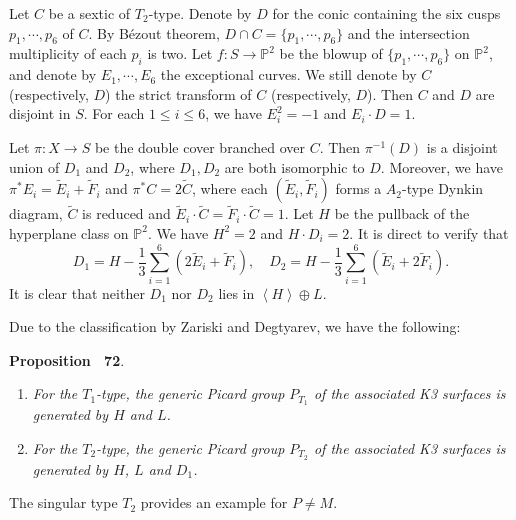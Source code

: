\documentclass[
]{article}
\begin{document}
Let \(C\) be a sextic of \(T_2\)-type. Denote by \(D\) for the conic
containing the six cusps \(p_1,\cdots,p_6\) of \(C\). By Bézout theorem,
\(D\cap C = \{ p_1,\cdots,p_6 \}\) and the intersection multiplicity of
each \(p_i\) is two. Let \(f\colon S\to \mathbb{P}^2\) be the blowup of
\(\{ p_1,\cdots,p_6 \}\) on \(\mathbb{P}^2\), and denote by
\(E_1,\cdots,E_6\) the exceptional curves. We still denote by \(C\)
(respectively, \(D\)) the strict transform of \(C\) (respectively,
\(D\)). Then \(C\) and \(D\) are disjoint in \(S\). For each
\(1\le i\le 6\), we have \(E_i^2=-1\) and \(E_i\cdot D=1\).

Let \(\pi\colon X\to S\) be the double cover branched over \(C\). Then
\(\pi^{-1}(D)\) is a disjoint union of \(D_1\) and \(D_2\), where
\(D_1,D_2\) are both isomorphic to \(D\). Moreover, we have
\(\pi^* E_i = \widetilde{E}_i + \widetilde{F}_i\) and
\(\pi^* C = 2 \widetilde{C}\), where each
\((\widetilde{E}_i,\widetilde{F}_i)\) forms a \(A_2\)-type Dynkin
diagram, \(\widetilde{C}\) is reduced and
\(\widetilde{E}_i\cdot \widetilde{C} = \widetilde{F}_i\cdot \widetilde{C} = 1\).
Let \(H\) be the pullback of the hyperplane class on \(\mathbb{P}^2\).
We have \(H^2=2\) and \(H\cdot D_i=2\). It is direct to verify that
\[D_1 = H - \frac{1}{3}\sum_{i=1}^6 (2 \widetilde{E}_i + \widetilde{F}_i),\quad D_2 = H - \frac{1}{3}\sum_{i=1}^6 (\widetilde{E}_i + 2 \widetilde{F}_i).\]
It is clear that neither \(D_1\) nor \(D_2\) lies in
\(\left\langle H\right\rangle \oplus L\).

Due to the classification by Zariski and Degtyarev, we have the
following:

\textbf{Proposition~ 72}.
\emph{\label{proposition: picard zariski pair}}

\begin{enumerate}
\def\labelenumi{(\roman{enumi})}
\item
  \emph{For the \(T_1\)-type, the generic Picard group \(P_{T_1}\) of
  the associated K3 surfaces is generated by \(H\) and \(L\).}
\item
  \emph{For the \(T_2\)-type, the generic Picard group \(P_{T_2}\) of
  the associated K3 surfaces is generated by \(H\), \(L\) and \(D_1\).}
\end{enumerate}

The singular type \(T_2\) provides an example for \(P\ne M\).
\end{document}
